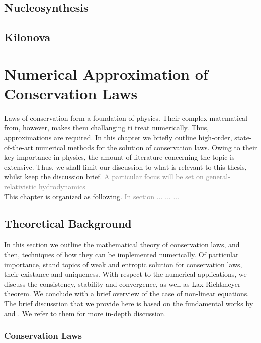 \documentclass[11pt,a4paper,headinclude=true,DIV=14,BCOR=8mm,chapterprefix,listof=totoc,twoside,openright,abstracton]{scrbook}
\newcommand{\gray}[1]{\textcolor{gray}{#1}}
\begin{document}
\section{Nucleosynthesis}
\section{Kilonova}




\chapter{Numerical Approximation of Conservation Laws}
\label{ch:theory:grhd_num_methods}

Laws of conservation form a foundation of physics. Their complex matematical from, however, makes them challanging ti treat numerically. Thus, approximations are required. In this chapter we briefly outline high-order, state-of-the-art numerical methods for the solution of conservation laws. Owing to their key importance in physics, the amount of literature concerning the topic is extensive. Thus, we shall limit our discussion to what is relevant to this thesis, whilst keep the discussion brief. \gray{A particular focus will be set on general-relativistic hydrodynamics} \\

This chapter is organized as following. \gray{In section ... ... ... }

\section{Theoretical Background}
\label{sec:theory:conserv_laws:theorback}

In this section we outline the mathematical theory of conservation laws, and then, techniques of how they can be implemented numerically. Of particular importance, stand topics of weak and entropic solution for conservation laws, their existance and uniqueness. With respect to the numerical applications, we discuss the consistency, stability and convergence, as well as Lax-Richtmeyer theorem. We conclude with a brief overview of the case of non-linear equations. The brief discusstion that we provide here is based on the fundamental works by \cite{LeVeque:1992} and \cite{Tadmor1998}. We refer to them for more in-depth discussion. 

\subsection{Conservation Laws}
\end{document}
